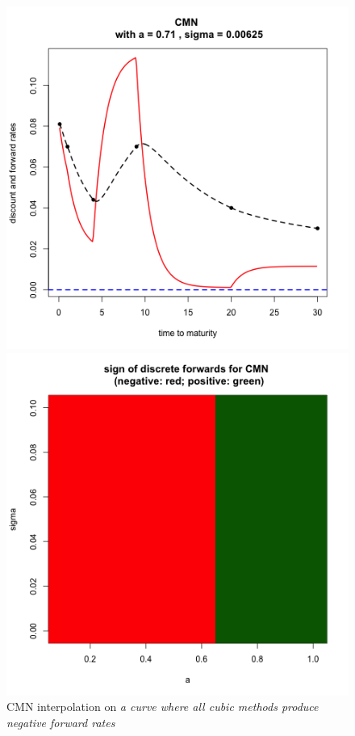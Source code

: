   
\begin{figure}[!htb]
    \centering
    \begin{minipage}{.5\textwidth}
        \centering
        \includegraphics[width=1.06\linewidth, height=0.35\textheight]{gfx/chapter-yc-insurance/construction_graph14}
        \caption{CMN interpolation on \textit{a curve where all cubic methods produce negative forward rates}}
        \label{fig:hagan2006examples3}
    \end{minipage}%
    \begin{minipage}{0.5\textwidth}
        \centering
        \includegraphics[width=1.06\linewidth, height=0.35\textheight]{gfx/chapter-yc-insurance/construction_graph17}

\end{minipage}
\end{figure}
